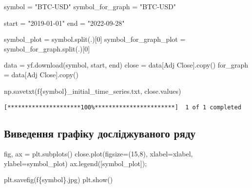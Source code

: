 \documentclass[
  letterpaper,
]{report}
\newenvironment{Shaded}{\begin{snugshade}}{\end{snugshade}}
\newcommand{\DecValTok}[1]{\textcolor[rgb]{0.68,0.00,0.00}{#1}}
\newcommand{\NormalTok}[1]{\textcolor[rgb]{0.00,0.23,0.31}{#1}}
\newcommand{\OperatorTok}[1]{\textcolor[rgb]{0.37,0.37,0.37}{#1}}
\newcommand{\SpecialCharTok}[1]{\textcolor[rgb]{0.37,0.37,0.37}{#1}}
\newcommand{\SpecialStringTok}[1]{\textcolor[rgb]{0.13,0.47,0.30}{#1}}
\newcommand{\StringTok}[1]{\textcolor[rgb]{0.13,0.47,0.30}{#1}}
\begin{document}
\begin{Shaded}
\begin{Highlighting}[]
\NormalTok{symbol }\OperatorTok{=} \StringTok{"BTC{-}USD"}
\NormalTok{symbol\_for\_graph }\OperatorTok{=} \StringTok{"BTC{-}USD"}

\NormalTok{start }\OperatorTok{=} \StringTok{"2019{-}01{-}01"}
\NormalTok{end }\OperatorTok{=} \StringTok{"2022{-}09{-}28"}

\NormalTok{symbol\_plot }\OperatorTok{=}\NormalTok{ symbol.split(}\StringTok{\textquotesingle{}.\textquotesingle{}}\NormalTok{)[}\DecValTok{0}\NormalTok{]}
\NormalTok{symbol\_for\_graph\_plot }\OperatorTok{=}\NormalTok{ symbol\_for\_graph.split(}\StringTok{\textquotesingle{}.\textquotesingle{}}\NormalTok{)[}\DecValTok{0}\NormalTok{]}

\NormalTok{data }\OperatorTok{=}\NormalTok{ yf.download(symbol, start, end)}
\NormalTok{close }\OperatorTok{=}\NormalTok{ data[}\StringTok{\textquotesingle{}Adj Close\textquotesingle{}}\NormalTok{].copy()}
\NormalTok{for\_graph }\OperatorTok{=}\NormalTok{ data[}\StringTok{\textquotesingle{}Adj Close\textquotesingle{}}\NormalTok{].copy()}

\NormalTok{np.savetxt(}\SpecialStringTok{f\textquotesingle{}}\SpecialCharTok{\{}\NormalTok{symbol}\SpecialCharTok{\}}\SpecialStringTok{\_initial\_time\_series.txt\textquotesingle{}}\NormalTok{, close.values)}
\end{Highlighting}
\end{Shaded}

\begin{verbatim}
[*********************100%***********************]  1 of 1 completed
\end{verbatim}

\hypertarget{ux432ux438ux432ux435ux434ux435ux43dux43dux44f-ux433ux440ux430ux444ux456ux43aux443-ux434ux43eux441ux43bux456ux434ux436ux443ux432ux430ux43dux43eux433ux43e-ux440ux44fux434ux443}{%
\subsection{Виведення графіку досліджуваного
ряду}\label{ux432ux438ux432ux435ux434ux435ux43dux43dux44f-ux433ux440ux430ux444ux456ux43aux443-ux434ux43eux441ux43bux456ux434ux436ux443ux432ux430ux43dux43eux433ux43e-ux440ux44fux434ux443}}

\begin{Shaded}
\begin{Highlighting}[]
\NormalTok{fig, ax }\OperatorTok{=}\NormalTok{ plt.subplots()}
\NormalTok{close.plot(figsize}\OperatorTok{=}\NormalTok{(}\DecValTok{15}\NormalTok{,}\DecValTok{8}\NormalTok{), xlabel}\OperatorTok{=}\NormalTok{xlabel, ylabel}\OperatorTok{=}\NormalTok{symbol\_plot)}
\NormalTok{ax.legend([symbol\_plot])}\OperatorTok{;}

\NormalTok{plt.savefig(}\SpecialStringTok{f\textquotesingle{}}\SpecialCharTok{\{}\NormalTok{symbol}\SpecialCharTok{\}}\SpecialStringTok{.jpg\textquotesingle{}}\NormalTok{)}
\NormalTok{plt.show()}
\end{Highlighting}
\end{Shaded}
\end{document}
